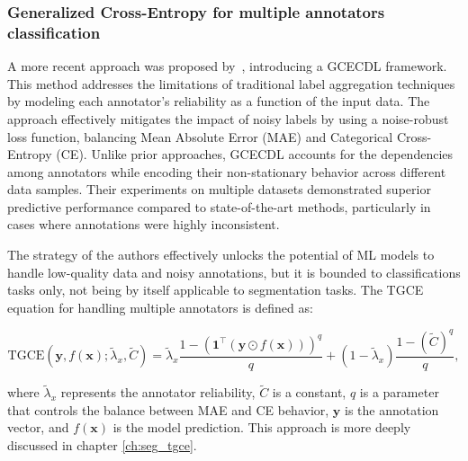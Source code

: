 \subsubsection{Generalized Cross-Entropy for multiple annotators classification}

A more recent approach was proposed by~\cite{TrianaEtAl2023},
introducing a \gls{GCECDL} framework. This method addresses the limitations of
traditional label aggregation techniques by modeling each annotator's
reliability as a function of the input data. The approach effectively
mitigates the impact of noisy labels by using a noise-robust loss
function, balancing Mean Absolute Error (MAE) and Categorical
Cross-Entropy (CE). Unlike prior approaches, \gls{GCECDL} accounts for the
dependencies among annotators while encoding their non-stationary
behavior across different data samples. Their experiments on
multiple datasets demonstrated superior predictive performance
compared to state-of-the-art methods, particularly in cases where
annotations were highly inconsistent.

The strategy of the authors effectively unlocks the potential of
\gls{ML} models to handle low-quality data and noisy annotations, but
it is bounded to classifications tasks only, not being by itself applicable to
segmentation tasks. The TGCE equation for handling multiple
annotators is defined as:

\begin{equation}
  \text{TGCE}(\mathbf{y}, f(\mathbf{x}); \tilde{\lambda}_x,
  \tilde{C}) = \tilde{\lambda}_x \frac{1-(\mathbf{1}^\top(\mathbf{y}
  \odot f(\mathbf{x})))^q}{q} + (1-\tilde{\lambda}_x)\frac{1-(\tilde{C})^q}{q},
\end{equation}

where $\tilde{\lambda}_x$ represents the annotator reliability,
$\tilde{C}$ is a constant, $q$ is a parameter that controls the
balance between MAE and CE behavior, $\mathbf{y}$ is the annotation
vector, and $f(\mathbf{x})$ is the model prediction. This approach is
more deeply discussed in chapter \ref{ch:seg_tgce}.

